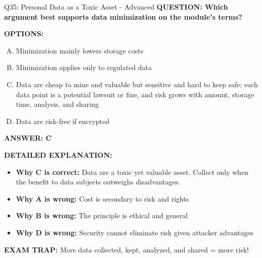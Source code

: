 \documentclass[8pt]{beamer}
\begin{document}
\begin{frame}[shrink=6]{Q35: Personal Data as a Toxic Asset - Advanced}
\fontsize{6.5}{7.5}\selectfont
\textbf{QUESTION: Which argument best supports data minimization on the module's terms?}

\vspace{0.1cm}
\textbf{OPTIONS:}
\begin{enumerate}[A.]
\item Minimization mainly lowers storage costs
\item Minimization applies only to regulated data
\item Data are cheap to mine and valuable but sensitive and hard to keep safe; each data point is a potential lawsuit or fine, and risk grows with amount, storage time, analysis, and sharing
\item Data are risk-free if encrypted
\end{enumerate}

\vspace{0.1cm}
\textcolor{myblue}{\textbf{ANSWER: C}}

\vspace{0.1cm}
\textbf{DETAILED EXPLANATION:}
\begin{itemize}
\item \textbf{Why C is correct:} Data are a toxic yet valuable asset. Collect only when the benefit to data subjects outweighs disadvantages.
\item \textbf{Why A is wrong:} Cost is secondary to risk and rights
\item \textbf{Why B is wrong:} The principle is ethical and general
\item \textbf{Why D is wrong:} Security cannot eliminate risk given attacker advantages
\end{itemize}

\textcolor{myred}{\textbf{EXAM TRAP:}} More data collected, kept, analyzed, and shared = more risk!
\end{frame}
\end{document}
